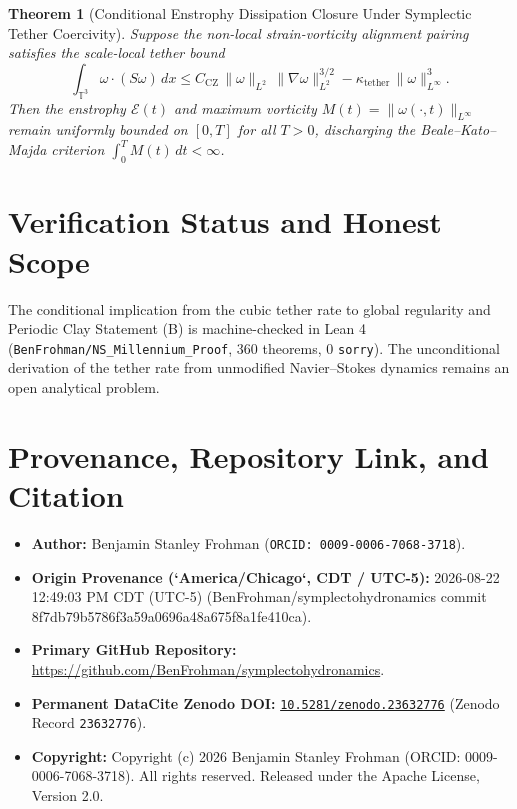 \documentclass[11pt,letterpaper]{article}
\newtheorem{theorem}{Theorem}
\begin{document}
\begin{theorem}[Conditional Enstrophy Dissipation Closure Under Symplectic Tether Coercivity]
Suppose the non-local strain-vorticity alignment pairing satisfies the scale-local tether bound
\begin{equation}
\int_{\mathbb{T}^3} \omega \cdot (S\omega)\,dx \le C_{\mathrm{CZ}}\,\|\omega\|_{L^2}\,\|\nabla \omega\|_{L^2}^{3/2} - \kappa_{\mathrm{tether}}\,\|\omega\|_{L^\infty}^3.
\end{equation}
Then the enstrophy $\mathcal{E}(t)$ and maximum vorticity $M(t) = \|\omega(\cdot,t)\|_{L^\infty}$ remain uniformly bounded on $[0,T]$ for all $T > 0$, discharging the Beale--Kato--Majda criterion $\int_0^T M(t)\,dt < \infty$.
\end{theorem}

\section{Verification Status and Honest Scope}
The conditional implication from the cubic tether rate to global regularity and Periodic Clay Statement (B) is machine-checked in Lean 4 (\texttt{BenFrohman/NS\_Millennium\_Proof}, 360 theorems, 0 \texttt{sorry}). The unconditional derivation of the tether rate from unmodified Navier--Stokes dynamics remains an open analytical problem.


\section*{Provenance, Repository Link, and Citation}
\begin{itemize}[leftmargin=2em]
  \item \textbf{Author:} Benjamin Stanley Frohman (\texttt{ORCID: 0009-0006-7068-3718}).
  \item \textbf{Origin Provenance (`America/Chicago`, CDT / UTC-5):} 2026-08-22 12:49:03 PM CDT (UTC-5) (BenFrohman/symplectohydronamics commit 8f7db79b5786f3a59a0696a48a675f8a1fe410ca).
  \item \textbf{Primary GitHub Repository:} \url{https://github.com/BenFrohman/symplectohydronamics}.
  \item \textbf{Permanent DataCite Zenodo DOI:} \href{https://doi.org/10.5281/zenodo.23632776}{\texttt{10.5281/zenodo.23632776}} (Zenodo Record \texttt{23632776}).
  \item \textbf{Copyright:} Copyright (c) 2026 Benjamin Stanley Frohman (ORCID: 0009-0006-7068-3718). All rights reserved. Released under the Apache License, Version 2.0.
\end{itemize}
\end{document}
